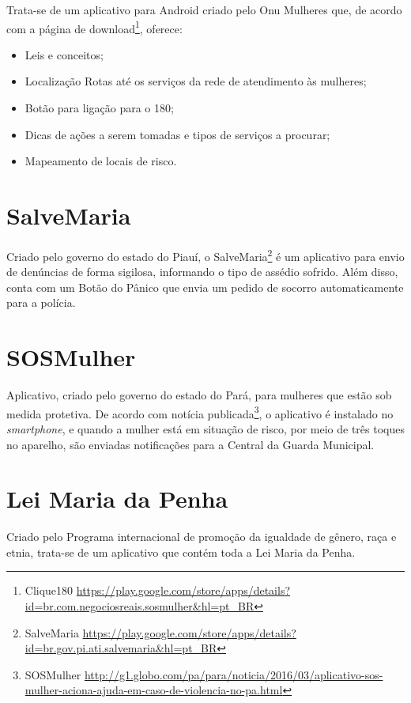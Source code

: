 Trata-se de um aplicativo para Android criado pelo Onu Mulheres que, de acordo com
a página de download\footnote{Clique180 \url{https://play.google.com/store/apps/details?id=br.com.negociosreais.sosmulher&hl=pt_BR}}, oferece:

\begin{itemize}
	\item Leis e conceitos;
	\item Localização Rotas até os serviços da rede de atendimento às mulheres;
	\item Botão para ligação para o 180;
	\item Dicas de ações a serem tomadas e tipos de serviços a procurar; 
	\item Mapeamento de locais de risco.
\end{itemize}

\section*{SalveMaria}

Criado pelo governo do estado do Piauí, o SalveMaria\footnote{SalveMaria \url{https://play.google.com/store/apps/details?id=br.gov.pi.ati.salvemaria&hl=pt_BR}} é um aplicativo para envio de denúncias
de forma sigilosa, informando o tipo de assédio sofrido.
Além disso, conta com um Botão do Pânico que envia um pedido de socorro automaticamente para a polícia.

\section*{SOSMulher}

Aplicativo, criado pelo governo do estado do Pará, para mulheres que estão sob medida protetiva. 
De acordo com notícia publicada\footnote{SOSMulher \url{http://g1.globo.com/pa/para/noticia/2016/03/aplicativo-sos-mulher-aciona-ajuda-em-caso-de-violencia-no-pa.html}}, o aplicativo é instalado no \textit{smartphone}, e quando a mulher está em situação de risco, por meio de três toques no aparelho, são enviadas notificações para a Central da Guarda Municipal.

\section*{Lei Maria da Penha}

Criado pelo Programa internacional de promoção da igualdade de gênero, raça e etnia, trata-se de um
aplicativo que contém toda a Lei Maria da Penha.

